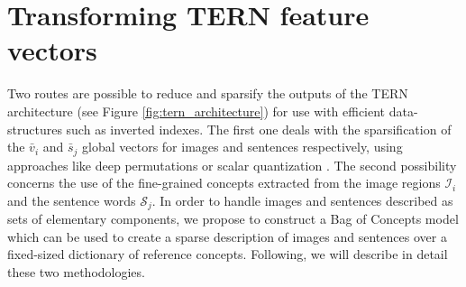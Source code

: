 \documentclass[conference]{IEEEtran}
\begin{document}






\section{Transforming TERN feature vectors}
Two routes are possible to reduce and sparsify the outputs of the TERN architecture (see Figure \ref{fig:tern_architecture}) for use with efficient data-structures such as inverted indexes. The first one deals with the sparsification of the $\bar{v}_i$ and $\bar{s}_j$ global vectors for images and sentences respectively, using approaches like deep permutations \cite{amato2016deeppermutations} or scalar quantization \cite{amato2019large}. The second possibility concerns the use of the fine-grained concepts extracted from the image regions $\mathcal{I}_i$ and the sentence words $\mathcal{S}_j$. In order to handle images and sentences described as sets of elementary components, we propose to construct a Bag of Concepts model which can be used to create a sparse description of images and sentences over a fixed-sized dictionary of reference concepts. Following, we will describe in detail these two methodologies.
\end{document}
